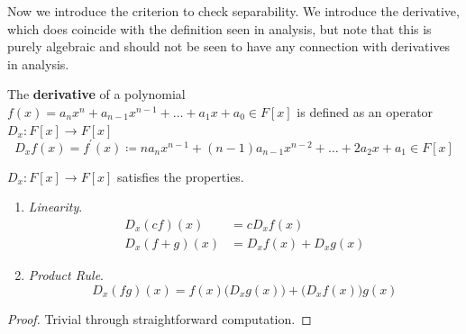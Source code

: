   Now we introduce the criterion to check separability. We introduce the derivative, which does coincide with the definition seen in analysis, but note that this is purely algebraic and should not be seen to have any connection with derivatives in analysis.  

  \begin{definition}[Derivative]
    \label{def:derivative}
    The \textbf{derivative} of a polynomial $f(x) = a_n x^n + a_{n-1} x^{n-1} + \ldots + a_1 x + a_0 \in F[x]$ is defined as an operator $D_x : F[x] \to F[x]$ 
    \begin{equation}
      D_x f(x) = f^\prime (x) \coloneqq n a_n x^{n-1} + (n-1) a_{n-1} x^{n-2} + \ldots + 2 a_2 x + a_1 \in F[x] 
    \end{equation}
  \end{definition}

  \begin{lemma}
    \label{thm:properties-of-the-polynomial-derivative}
    $D_x: F[x] \to F[x]$ satisfies the properties. 
    \begin{enumerate}
      \item \textit{Linearity}. 
        \begin{align}
          D_x (cf)(x) & = c D_x f(x) \\
          D_x (f + g)(x) & = D_x f(x) + D_x g(x) 
        \end{align}

      \item \textit{Product Rule}. 
        \begin{equation}
          D_x (fg)(x) = f(x) \big( D_x g(x) \big) + \big( D_x f(x) \big) g(x)
        \end{equation}
    \end{enumerate}
  \end{lemma}
  \begin{proof}
    Trivial through straightforward computation. 
  \end{proof}

